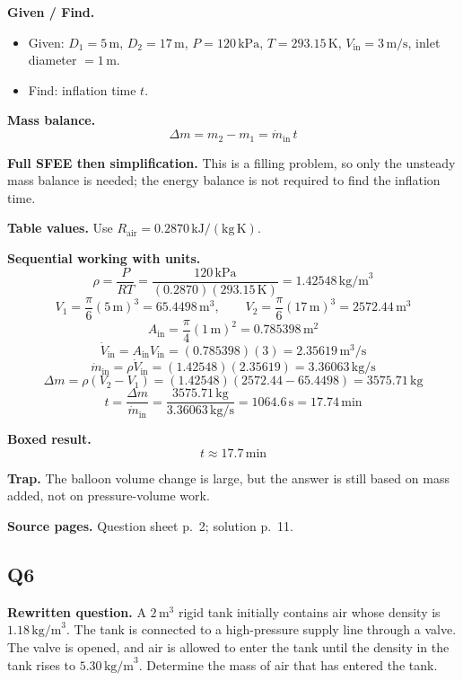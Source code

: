 \textbf{Given / Find.}
\begin{itemize}
  \item Given: $D_1=5\,\text{m}$, $D_2=17\,\text{m}$, $P=120\,\text{kPa}$, $T=293.15\,\text{K}$, $V_{\text{in}}=3\,\text{m/s}$, inlet diameter $=1\,\text{m}$.
  \item Find: inflation time $t$.
\end{itemize}

\textbf{Mass balance.}
\[
\Delta m = m_2-m_1 = \dot m_{\text{in}}\,t
\]

\textbf{Full SFEE then simplification.} This is a filling problem, so only the unsteady mass balance is needed; the energy balance is not required to find the inflation time.

\textbf{Table values.} Use $R_{\text{air}}=0.2870\,\mathrm{kJ/(kg\,K)}$.

\textbf{Sequential working with units.}
\[
\rho = \frac{P}{RT} = \frac{120\,\text{kPa}}{(0.2870)(293.15\,\text{K})} = 1.42548\,\text{kg/m}^3
\]
\[
V_1=\frac{\pi}{6}(5\,\text{m})^3=65.4498\,\text{m}^3,\qquad
V_2=\frac{\pi}{6}(17\,\text{m})^3=2572.44\,\text{m}^3
\]
\[
A_{\text{in}}=\frac{\pi}{4}(1\,\text{m})^2=0.785398\,\text{m}^2
\]
\[
\dot V_{\text{in}}=A_{\text{in}}V_{\text{in}}=(0.785398)(3)=2.35619\,\text{m}^3/\text{s}
\]
\[
\dot m_{\text{in}}=\rho\dot V_{\text{in}}=(1.42548)(2.35619)=3.36063\,\text{kg/s}
\]
\[
\Delta m = \rho(V_2-V_1) = (1.42548)(2572.44-65.4498)=3575.71\,\text{kg}
\]
\[
t=\frac{\Delta m}{\dot m_{\text{in}}}=\frac{3575.71\,\text{kg}}{3.36063\,\text{kg/s}}=1064.6\,\text{s}=17.74\,\text{min}
\]

\textbf{Boxed result.}
\[
\boxed{t \approx 17.7\,\text{min}}
\]

\textbf{Trap.} The balloon volume change is large, but the answer is still based on mass added, not on pressure-volume work.

\textbf{Source pages.} Question sheet p.~2; solution p.~11.

\subsection*{Q6}
\textbf{Rewritten question.} A $2\,\text{m}^3$ rigid tank initially contains air whose density is $1.18\,\text{kg/m}^3$. The tank is connected to a high-pressure supply line through a valve. The valve is opened, and air is allowed to enter the tank until the density in the tank rises to $5.30\,\text{kg/m}^3$. Determine the mass of air that has entered the tank.

